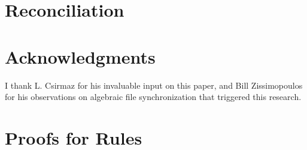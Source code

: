 \documentclass[12pt]{article}
\begin{document}
\section{Reconciliation}















\section{Acknowledgments}

I thank L. Csirmaz for his invaluable input on this paper,
and Bill Zissimopoulos for his observations on algebraic file synchronization that triggered this research.

\begin{thebibliography}{99}



\end{thebibliography}

\appendix

\section{Proofs for Rules}

\end{document}
